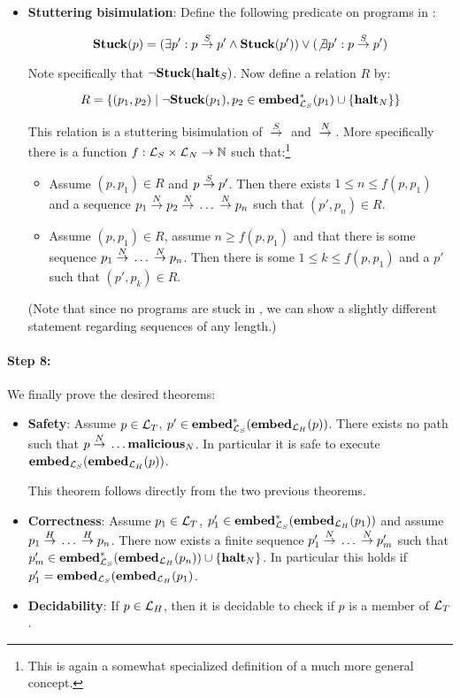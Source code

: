 \begin{itemize}
\item \textbf{Stuttering bisimulation}: Define the following predicate on
  programs in \simplelang:

  $$\mathbf{Stuck}(p) = (\exists p': p {{}\stackrel{S}{->}{}} p' \land \mathbf{Stuck}(p')) \lor (\not\exists p': p {{}\stackrel{S}{->}{}} p')$$

  Note specifically that $\neg\mathbf{Stuck}({\mathbf{halt}_S})$. Now define a relation $R$
  by:

  $$R = \{(p_1, p_2) \mid \neg\mathbf{Stuck}(p_1), p_2 \in \mathbf{embed}^\ast_{\mathcal{L}_S}(p_1) \cup \{{\mathbf{halt}_N}\}\}$$

  This relation is a stuttering bisimulation of ${{}\stackrel{S}{->}{}}$ and
  ${{}\stackrel{N}{->}{}}$. More specifically there is a function
  $f : \mathcal{L}_S \times \mathcal{L}_N \to \mathbb{N}$ such that:\footnote{This is
    again a somewhat specialized definition of a much more general concept.}

  \begin{itemize}
  \item Assume $(p, p_1) \in R$ and $p {{}\stackrel{S}{->}{}} p'$. Then there exists
    $1 \leq n \leq f(p, p_1)$ and a sequence
    $p_1 {{}\stackrel{N}{->}{}} p_2 {{}\stackrel{N}{->}{}} \dots {{}\ensuremath{\stackrel{N}{->}}{}} p_n$ such that
    $(p', p_n) \in R$.
  \item Assume $(p, p_1) \in R$, assume $n \geq f(p, p_1)$ and that there is
    some sequence $p_1 {{}\stackrel{N}{->}{}} \dots {{}\ensuremath{\stackrel{N}{->}}{}} p_n$. Then there is some
    $1 \leq k \leq f(p, p_1)$ and a $p'$ such that $(p', p_k) \in R$.
  \end{itemize}

  (Note that since no programs are stuck in \nativelang, we can show a slightly
  different statement regarding sequences of any length.)
\end{itemize}

\paragraph{Step 8:} We finally prove the desired theorems:
\begin{itemize}
\item \textbf{Safety}: Assume $p \in \mathcal{L}_T$,
  $p' \in \mathbf{embed}^\ast_{\mathcal{L}_S}({\mathbf{embed}}_{\mathcal{L}_H}(p))$. There exists no path such that
  $p {{}\stackrel{N}{->}{}} \dots {\ensuremath{{\mathbf{malicious}}_N}}$. In particular it is safe to
  execute ${\mathbf{embed}}_{\mathcal{L}_S}({\mathbf{embed}}_{\mathcal{L}_H}(p))$.

  This theorem follows directly from the two previous theorems.

\item \textbf{Correctness}: Assume $p_1 \in \mathcal{L}_T$,
  $p_1' \in \mathbf{embed}^\ast_{\mathcal{L}_S}({\mathbf{embed}}_{\mathcal{L}_H}(p_1))$ and assume
  $p_1 {{}\stackrel{H}{->}{}} \dots {{}\ensuremath{\stackrel{H}{->}}{}} p_n$. There now exists a finite sequence
  $p_1' {{}\stackrel{N}{->}{}} \dots {{}\ensuremath{\stackrel{N}{->}}{}} p_m'$ such that
  $p_m' \in \mathbf{embed}^\ast_{\mathcal{L}_S}({\mathbf{embed}}_{\mathcal{L}_H}(p_n)) \cup \{{\mathbf{halt}_N}\}$. In
  particular this holds if $p_1' = {\mathbf{embed}}_{\mathcal{L}_S}({\mathbf{embed}}_{\mathcal{L}_H}(p_1)$.

\item \textbf{Decidability}: If $p \in \mathcal{L}_H$, then it is decidable to check
  if $p$ is a member of $\mathcal{L}_T$.
\end{itemize}

